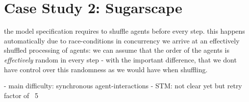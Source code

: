 \section{Case Study 2: Sugarscape}
the model specification requires to shuffle agents before every step. this happens automatically due to race-conditions in concurrency we arrive at an effectively shuffled processing of agents: we can assume that the order of the agents is \textit{effectively} random in every step - with the important difference, that we dont have control over this randomness as we would have when shuffling.

- main difficulty: synchronous agent-interactions
- STM: not clear yet but retry factor of ~5
